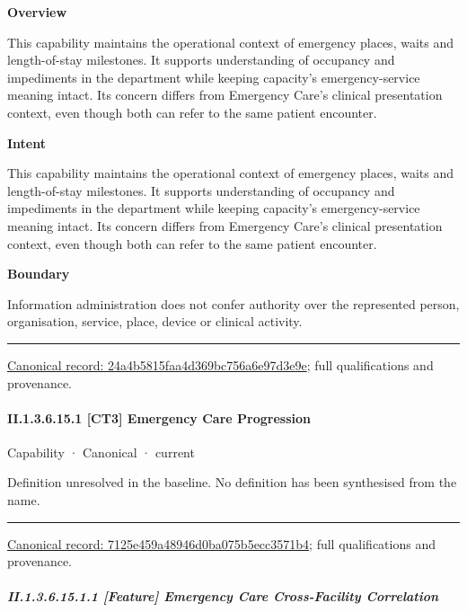 \textbf{Overview}



This capability maintains the operational context of emergency places, waits and length-of-stay milestones. It supports understanding of occupancy and impediments in the department while keeping capacity's emergency-service meaning intact. Its concern differs from Emergency Care's clinical presentation context, even though both can refer to the same patient encounter.



\textbf{Intent}



This capability maintains the operational context of emergency places, waits and length-of-stay milestones. It supports understanding of occupancy and impediments in the department while keeping capacity's emergency-service meaning intact. Its concern differs from Emergency Care's clinical presentation context, even though both can refer to the same patient encounter.



\textbf{Boundary}



Information administration does not confer authority over the represented person, organisation, service, place, device or clinical activity.



\medskip\hrule\medskip

{\footnotesize \href{../../../../continuum/strategy/capability/24a4b5815faa4d369bc756a6e97d3e9e.md}{Canonical record: 24a4b5815faa4d369bc756a6e97d3e9e}; full qualifications and provenance.}\par
\paragraph*{II.1.3.6.15.1 [CT3] Emergency Care Progression}
\label{navigation:II.1.3.6.15.1}

\label{element:7125e459a48946d0ba075b5ecc3571b4}
{\small Capability · Canonical · current}\par

Definition unresolved in the baseline. No definition has been synthesised from the name.



\medskip\hrule\medskip

{\footnotesize \href{../../../../continuum/strategy/capability/7125e459a48946d0ba075b5ecc3571b4.md}{Canonical record: 7125e459a48946d0ba075b5ecc3571b4}; full qualifications and provenance.}\par
\subparagraph*{II.1.3.6.15.1.1 [Feature] Emergency Care Cross-Facility Correlation}
\label{navigation:II.1.3.6.15.1.1}

